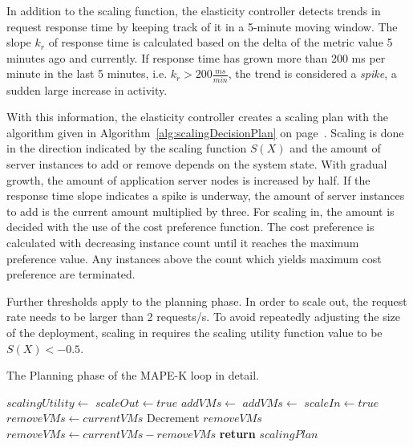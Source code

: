 \documentclass[english]{tktltiki2}
\theoremstyle{definition}
\theoremstyle{remark}
\begin{document}
In addition to the scaling function, the elasticity controller detects trends
in request response time by keeping track of it in a 5-minute moving window.
The slope $k_{r}$ of response time is calculated based on the delta of the
metric value 5 minutes ago and currently. If response time has grown more than
200 ms per minute in the last 5 minutes, i.e. $k_{r} > 200 \frac{ms}{min}$,
the trend is considered a \textit{spike}, a sudden large increase in activity.

With this information, the elasticity controller creates a scaling plan with
the algorithm given in Algorithm~\ref{alg:scalingDecisionPlan} on
page~\pageref{alg:scalingDecisionPlan}. Scaling is done in the direction
indicated by the scaling function $S(X)$ and the amount of server instances to
add or remove depends on the system state. With gradual growth, the amount of
application server nodes is increased by half. If the response time slope
indicates a spike is underway, the amount of server instances to add is the
current amount multiplied by three. For scaling in, the amount is decided with
the use of the cost preference function. The cost preference is calculated
with decreasing instance count until it reaches the maximum preference value.
Any instances above the count which yields maximum cost preference are
terminated.

Further thresholds apply to the planning phase. In order to scale out, the
request rate needs to be larger than 2 requests/s. To avoid repeatedly adjusting
the size of the deployment, scaling in requires the scaling utility function
value to be $S(X) < -0.5$.

\begin{algorithm}[!h]
  \caption{The Planning phase of the MAPE-K loop in detail.}\label{alg:scalingDecisionPlan}
  \begin{algorithmic}[1]
    	\State $scalingUtility\gets$  
    		\State $scaleOut \gets true$
    			\State $addVMs \gets$ 
    		\Else
    			\State $addVMs \gets$ 
    		\EndIf
    		\State $scaleIn \gets true$
    		\State $removeVMs \gets currentVMs$
    		 
    			\State Decrement $removeVMs$
    		\EndWhile
    		\State $removeVMs \gets currentVMs - removeVMs$
    	\EndIf
    	\State \textbf{return} $scalingPlan$
    \EndProcedure
    \end{algorithmic}
\end{algorithm}
\end{document}
